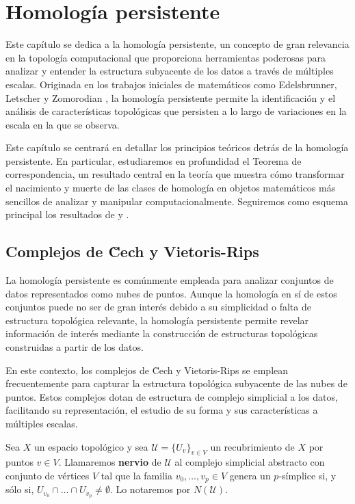 
\chapter{Homología persistente}

Este capítulo se dedica a la homología persistente, un concepto de gran relevancia en la topología computacional que proporciona herramientas poderosas para analizar y entender la estructura subyacente de los datos a través de múltiples escalas. Originada en los trabajos iniciales de matemáticos como Edelsbrunner, Letscher y Zomorodian \cite{edelsbrunner2002topological}, la homología persistente permite la identificación y el análisis de características topológicas que persisten a lo largo de variaciones en la escala en la que se observa.

Este capítulo se centrará en detallar los principios teóricos detrás de la homología persistente. En particular, estudiaremos en profundidad el Teorema de correspondencia, un resultado central en la teoría que muestra cómo transformar el nacimiento y muerte de las clases de homología en objetos matemáticos más sencillos de analizar y manipular computacionalmente. Seguiremos como esquema principal los resultados de \cite{zomorodian2004computing} y \cite{dey2022computational}.

\section{Complejos de \u Cech y Vietoris-Rips}

La homología persistente es comúnmente empleada para analizar conjuntos de datos representados como nubes de puntos. Aunque la homología en sí de estos conjuntos puede no ser de gran interés debido a su simplicidad o falta de estructura topológica relevante, la homología persistente permite revelar información de interés mediante la construcción de estructuras topológicas construidas a partir de los datos.

En este contexto, los complejos de \u Cech y Vietoris-Rips se emplean frecuentemente para capturar la estructura topológica subyacente de las nubes de puntos. Estos complejos dotan de estructura de complejo simplicial a los datos, facilitando su representación, el estudio de su forma y sus características a múltiples escalas.

\begin{definicion}
	Sea \(X\) un espacio topológico y sea \(\mathcal{U} = \{U_v\}_{v \in V}\) un recubrimiento de \(X\) por puntos \(v \in V\). Llamaremos \textbf{nervio} de \(\mathcal{U}\) al complejo simplicial abstracto con conjunto de vértices \(V\) tal que la familia \(v_0, \dots, v_p \in V\) genera un \(p\)-símplice si, y sólo si, \(U_{v_0} \cap \dots \cap U_{v_p} \neq \emptyset\). Lo notaremos por \(N(\mathcal{U})\).
\end{definicion}

